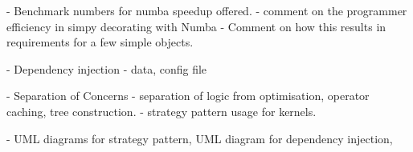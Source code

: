 - Benchmark numbers for numba speedup offered.
- comment on the programmer efficiency in simpy decorating
with Numba
- Comment on how this results in requirements for a few simple objects.

- Dependency injection
    - data, config file

- Separation of Concerns
    - separation of logic from optimisation, operator caching,
    tree construction.
    - strategy pattern usage for kernels.

- UML diagrams for strategy pattern, UML diagram for dependency injection,